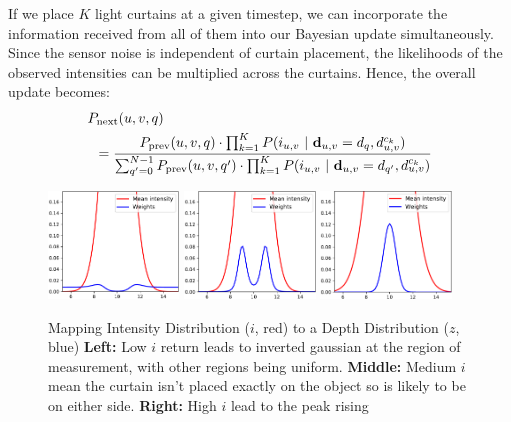 If we place $K$ light curtains at a given timestep, we can incorporate the information received from all of them into our Bayesian update simultaneously. Since the sensor noise is independent of curtain placement, the likelihoods of the observed intensities can be multiplied across the curtains. Hence, the overall update becomes: 
\begin{align*}
   &\after{q} \\
   &\hspace{5pt}= \frac{\before{q} \cdot \prod_{k=1}^K P(i_{u, v}\ |\ \dd_{u, v} = d_q, d^{c_k}_{u, v})}{\sum_{\qb=0}^{N-1} \before{\qb} \cdot \prod_{k=1}^K P(i_{u, v}\ |\ \dd_{u, v} = d_{\qb}, d^{c_k}_{u, v})}
\end{align*} 

\begin{figure}[h]
   \centering
   \begin{minipage}{0.5\textwidth}
       \centering
       \includegraphics[width=0.31\textwidth]{figures/aa.pdf}
       \includegraphics[width=0.31\textwidth]{figures/bb.pdf}
       \includegraphics[width=0.31\textwidth]{figures/cc.pdf}
   \end{minipage}\hfill
   \centering
   \caption{Mapping Intensity Distribution ($i$, red) to a Depth Distribution ($z$, blue) \textbf{Left:} Low $i$ return leads to inverted gaussian at the region of measurement, with other regions being uniform. \textbf{Middle:} Medium $i$ mean the curtain isn't placed exactly on the object so is likely to be on either side. \textbf{Right:} High $i$ lead to the peak rising}
   \label{fig:updatemodel}
\end{figure}

